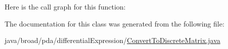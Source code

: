 Here is the call graph for this function\+:




The documentation for this class was generated from the following file\+:\begin{DoxyCompactItemize}
\item 
java/broad/pda/differential\+Expression/\hyperlink{_convert_to_discrete_matrix_8java}{Convert\+To\+Discrete\+Matrix.\+java}\end{DoxyCompactItemize}

